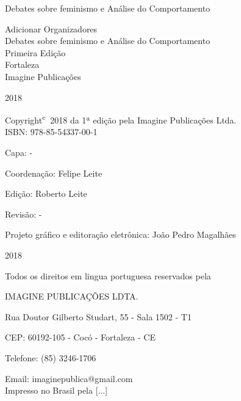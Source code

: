 \documentclass[hidelinks, 4pt]{bookest}
\let\orignewcommand\newcommand  %
\let\newcommand\providecommand  %
\let\newcommand\orignewcommand  %
\newcommand\blankpage{%
    \null
    \thispagestyle{empty}%
    \addtocounter{page}{-1}%
    \newpage}
\begin{document}
%
\begin{titlepage}
\begin{center}
\vspace*{\fill}
{\Huge Debates sobre feminismo e Análise do Comportamento}
\vspace*{\fill}
\pagebreak
\afterpage{\blankpage}
\end{center}
\begin{center}
{\Large Adicionar Organizadores}\\[4cm]
{\Huge Debates sobre feminismo e Análise do Comportamento}\\[4cm]

{\Large Primeira Edição}\\[3cm]


{\large Fortaleza\\
Imagine Publicações}

2018
\pagebreak
\thispagestyle{empty}
\end{center}
\pagebreak

Copyright\textsuperscript{\textcircled{c}} 2018 da 1ª edição pela Imagine Publicações Ltda.\\

ISBN: 978-85-54337-00-1

Capa: -

Coordenação: Felipe Leite

Edição: Roberto Leite

Revisão: -

Projeto gráfico e editoração eletrônica: João Pedro Magalhães\\
\vfill
\begin{center}
\end{center}

2018

Todos os direitos em lingua portuguesa reservados pela

IMAGINE PUBLICAÇÕES LDTA.

Rua Doutor Gilberto Studart, 55 - Sala 1502 - T1

CEP: 60192-105 - Cocó - Fortaleza - CE

Telefone: (85) 3246-1706

Email: imaginepublica@gmail.com\\

Impresso no Brasil pela [...]
\thispagestyle{empty}
\end{titlepage}











\end{document}
